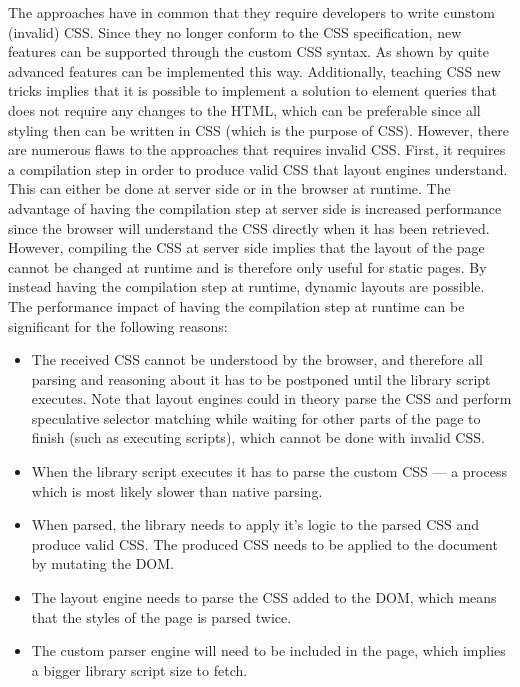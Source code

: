 \documentclass[a4paper,11pt]{kth-mag}
\begin{document}
    
    The approaches \cite{eq_imp_magichtml,eq_imp_eqcss,eq_imp_prollyfill-min-width,eq_imp_localised-css,eq_imp_gss} have in common that they require developers to write cunstom (invalid) \gls{CSS}.
    Since they no longer conform to the \gls{CSS} specification, new features can be supported through the custom \gls{CSS} syntax.
    As shown by \cite{eq_imp_eqcss,eq_imp_gss} quite advanced features can be implemented this way.
    Additionally, teaching \gls{CSS} new tricks implies that it is possible to implement a solution to element queries that does not require any changes to the \gls{HTML}, which can be preferable since all styling then can be written in \gls{CSS} (which is the purpose of \gls{CSS}).
    However, there are numerous flaws to the approaches that requires invalid \gls{CSS}.
    First, it requires a compilation step in order to produce valid \gls{CSS} that layout engines understand.
    This can either be done at server side or in the browser at runtime.
    The advantage of having the compilation step at server side is increased performance since the browser will understand the \gls{CSS} directly when it has been retrieved.
    However, compiling the \gls{CSS} at server side implies that the layout of the page cannot be changed at runtime and is therefore only useful for static pages.
    By instead having the compilation step at runtime, dynamic layouts are possible.
    The performance impact of having the compilation step at runtime can be significant for the following reasons:
    \begin{itemize}
      \item The received \gls{CSS} cannot be understood by the browser, and therefore all parsing and reasoning about it has to be postponed until the library script executes.
      Note that layout engines could in theory parse the \gls{CSS} and perform speculative selector matching while waiting for other parts of the page to finish (such as executing scripts), which cannot be done with invalid \gls{CSS}.
      \item When the library script executes it has to parse the custom \gls{CSS} --- a process which is most likely slower than native parsing.
      \item When parsed, the library needs to apply it's logic to the parsed \gls{CSS} and produce valid \gls{CSS}. The produced \gls{CSS} needs to be applied to the document by mutating the \gls{DOM}.
      \item The layout engine needs to parse the \gls{CSS} added to the \gls{DOM}, which means that the styles of the page is parsed twice.
      \item The custom parser engine will need to be included in the page, which implies a bigger library script size to fetch.
    \end{itemize}
\end{document}
